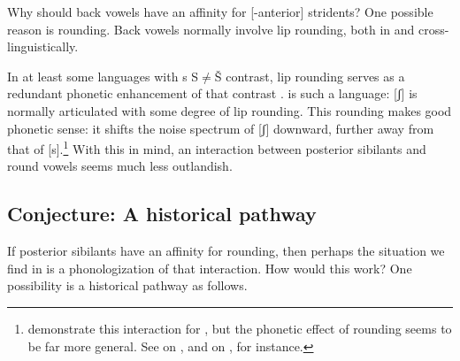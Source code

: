 Why should back vowels have an affinity for [-anterior] stridents? One possible reason is rounding. Back vowels normally involve lip rounding, both in  and cross-linguistically. 

In at least some languages with s S${\neq}$Š contrast, lip rounding serves as a redundant phonetic enhancement of that contrast \citep{Stevens1986,Keyser&Stevens2006}.  is such a language: [ʃ] is normally articulated with some degree of lip rounding. This rounding makes good phonetic sense: it shifts the noise spectrum of [ʃ] downward, further away from that of [s].\footnote{\citet[49]{Keyser&Stevens2006} demonstrate this interaction for , but the phonetic effect of rounding seems to be far more general. See \citet[7]{NiChiosain&Padgett2001} on , and \citet[342-343]{McCollum2015} on , for instance.} With this in mind, an interaction between posterior sibilants and round vowels seems much less outlandish. 

\subsection{Conjecture: A historical pathway}\label{sec:bennett:4.2}

If posterior sibilants have an affinity for rounding, then perhaps the situation we find in  is a phonologization of that interaction. How would this work? One possibility is a historical pathway as follows.

